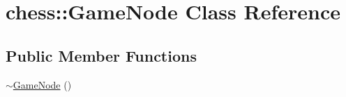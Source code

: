 \hypertarget{classchess_1_1GameNode}{\section{chess\-:\-:Game\-Node Class Reference}
\label{classchess_1_1GameNode}
}
\subsection*{Public Member Functions}
\begin{DoxyCompactItemize}
\item 
\hypertarget{classchess_1_1GameNode_ae0efe18314ec18e2a5cd2c1e5c3bd741}{\hyperlink{classchess_1_1GameNode_ae0efe18314ec18e2a5cd2c1e5c3bd741}{$\sim$\-Game\-Node} ()}\label{classchess_1_1GameNode_ae0efe18314ec18e2a5cd2c1e5c3bd741}


\end{DoxyCompactItemize}
